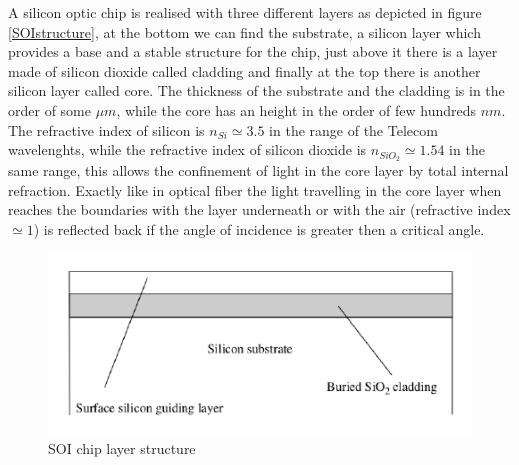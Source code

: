\documentclass[10pt]{book}
\begin{document}
A silicon optic chip is realised with three different layers as depicted in figure \eqref{SOIstructure}, at the bottom we can find the substrate, a silicon layer which provides a base and a stable structure for the chip, just above it there is a layer made of silicon dioxide called cladding and finally at the top there is another silicon layer called core. The thickness of the substrate and the cladding is in the order of some $\mu m$, while the core has an height in the order of few hundreds $nm$. The refractive index of silicon is $n_{Si} \simeq 3.5$ in the range of the Telecom wavelenghts, while the refractive index of silicon dioxide is $n_{SiO_2}\simeq 1.54$ in the same range, this allows the confinement of light in the core layer by total internal refraction. Exactly like in optical fiber the light travelling in the core layer when reaches the boundaries with the layer underneath or with the air (refractive index $\simeq 1$) is reflected back if the angle of incidence is greater then a critical angle. 
\begin{figure}
\centering
\includegraphics[width = .7\textwidth]{img/SOIstructure}
\caption{SOI chip layer structure}
\label{SOIstructure}
\end{figure}
\end{document}
